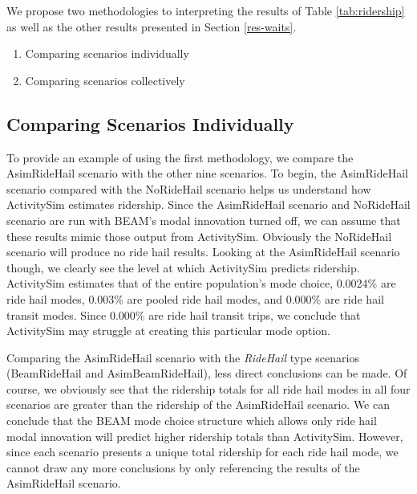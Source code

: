\documentclass[12pt, oneside, openright]{byuthesis}
\providecommand{\tightlist}{%
  \setlength{\itemsep}{0pt}\setlength{\parskip}{0pt}}
\begin{document}
We propose two methodologies to interpreting the results of Table \ref{tab:ridership} as well as the other results presented in Section \ref{res-waits}.

\begin{enumerate}
\def\labelenumi{\arabic{enumi}.}
\tightlist
\item
  Comparing scenarios individually
\item
  Comparing scenarios collectively
\end{enumerate}

\hypertarget{res-ind}{%
\subsection{Comparing Scenarios Individually}\label{res-ind}}

To provide an example of using the first methodology, we compare the AsimRideHail scenario with the other nine scenarios. To begin, the AsimRideHail scenario compared with the NoRideHail scenario helps us understand how ActivitySim estimates ridership. Since the AsimRideHail scenario and NoRideHail scenario are run with BEAM's modal innovation turned off, we can assume that these results mimic those output from ActivitySim. Obviously the NoRideHail scenario will produce no ride hail results. Looking at the AsimRideHail scenario though, we clearly see the level at which ActivitySim predicts ridership. ActivitySim estimates that of the entire population's mode choice, 0.0024\% are ride hail modes, 0.003\% are pooled ride hail modes, and 0.000\% are ride hail transit modes. Since 0.000\% are ride hail transit trips, we conclude that ActivitySim may struggle at creating this particular mode option.

Comparing the AsimRideHail scenario with the \emph{RideHail} type scenarios (BeamRideHail and AsimBeamRideHail), less direct conclusions can be made. Of course, we obviously see that the ridership totals for all ride hail modes in all four scenarios are greater than the ridership of the AsimRideHail scenario. We can conclude that the BEAM mode choice structure which allows only ride hail modal innovation will predict higher ridership totals than ActivitySim. However, since each scenario presents a unique total ridership for each ride hail mode, we cannot draw any more conclusions by only referencing the results of the AsimRideHail scenario.
\end{document}
